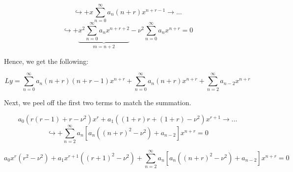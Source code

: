 $$ \hookrightarrow + x\sum_{n =0}^{\infty} a_n (n+r)x^{n+r-1} \rightarrow ...$$
$$ \hookrightarrow + \underbrace{x^2\sum_{n = 0}^\infty a_n x^{n+r+2}}_{m = n+2} - \nu^2\sum_{n = 0}^\infty a_n x^{n+r} = 0$$

Hence, we get the following:

$$Ly = \sum_{n = 0}^\infty a_n (n+r)(n+r-1) x^{n+r} + \sum_{n=0}^\infty a_n (n+r) x^{n+r} + \sum_{n = 2}^\infty a_{n-2} x^{n+r}$$

Next, we peel off the first two terms to match the summation. 

$$a_0 (r(r-1) + r - \nu^2) x^r + a_1 ((1+r) r + (1+r) - \nu^2) x^{r+1} \rightarrow ... $$
$$ \hookrightarrow + \sum_{n = 2}^\infty a_n \left[ a_n \left( (n+r)^2 - \nu^2 \right) + a_{n-2} \right] x^{n+r} = 0$$

$$a_0 x^r (r^2 - \nu^2) + a_1 x^{r+1} \left((r+1)^2 - \nu^2 \right)  + \sum_{n = 2}^\infty a_n \left[ a_n \left( (n+r)^2 - \nu^2 \right) + a_{n-2} \right] x^{n+r} = 0$$
